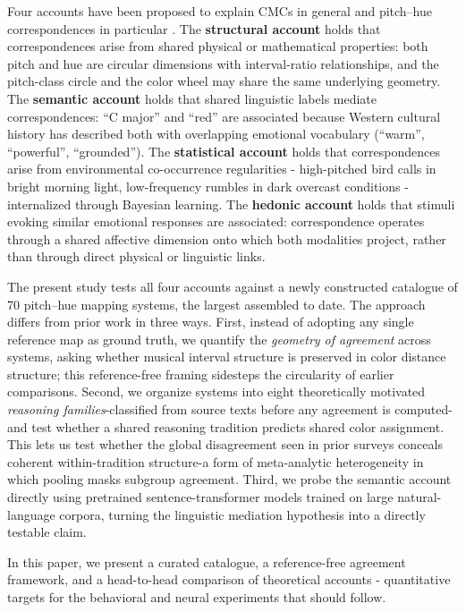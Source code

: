 \documentclass[12pt]{article}
\begin{document}
Four accounts have been proposed to explain CMCs in general and
pitch--hue correspondences in particular \citep{spence2011,deroy2016}.
The \textbf{structural account} \citep{marks1978} holds that
correspondences arise from shared physical or mathematical properties:
both pitch and hue are circular dimensions with interval-ratio
relationships, and the pitch-class circle and the color wheel may share
the same underlying geometry. The \textbf{semantic account}
\citep{martino2001,walker2016} holds that shared linguistic labels
mediate correspondences: ``C major'' and ``red'' are associated because
Western cultural history has described both with overlapping emotional
vocabulary (``warm'', ``powerful'', ``grounded''). The
\textbf{statistical account} \citep{parise2014} holds that
correspondences arise from environmental co-occurrence
regularities - high-pitched bird calls in bright morning light,
low-frequency rumbles in dark overcast conditions - internalized through
Bayesian learning. The \textbf{hedonic account} \citep{palmer2013}
holds that stimuli evoking similar emotional responses are associated:
correspondence operates through a shared affective dimension onto which
both modalities project, rather than through direct physical or
linguistic links.

The present study tests all four accounts against a newly constructed
catalogue of 70 pitch--hue mapping systems, the largest assembled to
date. The approach differs from prior work in three ways. First, instead
of adopting any single reference map as ground truth, we quantify the
\emph{geometry of agreement} across systems, asking whether musical
interval structure is preserved in color distance structure; this
reference-free framing sidesteps the circularity of earlier comparisons.
Second, we organize systems into eight theoretically motivated
\emph{reasoning families}-classified from source texts before any
agreement is computed-and test whether a shared reasoning tradition
predicts shared color assignment. This lets us test whether the global
disagreement seen in prior surveys conceals coherent within-tradition
structure-a form of meta-analytic heterogeneity in which pooling
masks subgroup agreement. Third, we probe the semantic
account directly using pretrained sentence-transformer models
\citep{wang2020,song2020,nussbaum2024} trained on large
natural-language corpora, turning the linguistic mediation hypothesis
into a directly testable claim.

In this paper, we present a curated catalogue, a reference-free agreement framework, and a
head-to-head comparison of theoretical accounts - quantitative targets
for the behavioral and neural experiments that should follow.
\end{document}
